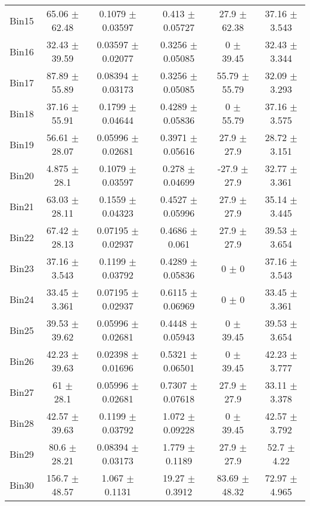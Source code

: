 \begin{tabular}{@{\extracolsep{4pt}}lccccc@{}}
     Bin15 & 65.06 $\pm$ 62.48 & 0.1079 $\pm$ 0.03597 & 0.413 $\pm$ 0.05727 & 27.9 $\pm$ 62.38 & 37.16 $\pm$ 3.543 \\ 
     Bin16 & 32.43 $\pm$ 39.59 & 0.03597 $\pm$ 0.02077 & 0.3256 $\pm$ 0.05085 & 0 $\pm$ 39.45 & 32.43 $\pm$ 3.344 \\ 
     Bin17 & 87.89 $\pm$ 55.89 & 0.08394 $\pm$ 0.03173 & 0.3256 $\pm$ 0.05085 & 55.79 $\pm$ 55.79 & 32.09 $\pm$ 3.293 \\ 
     Bin18 & 37.16 $\pm$ 55.91 & 0.1799 $\pm$ 0.04644 & 0.4289 $\pm$ 0.05836 & 0 $\pm$ 55.79 & 37.16 $\pm$ 3.575 \\ 
     Bin19 & 56.61 $\pm$ 28.07 & 0.05996 $\pm$ 0.02681 & 0.3971 $\pm$ 0.05616 & 27.9 $\pm$ 27.9 & 28.72 $\pm$ 3.151 \\ 
     Bin20 & 4.875 $\pm$ 28.1 & 0.1079 $\pm$ 0.03597 & 0.278 $\pm$ 0.04699 & -27.9 $\pm$ 27.9 & 32.77 $\pm$ 3.361 \\ 
     Bin21 & 63.03 $\pm$ 28.11 & 0.1559 $\pm$ 0.04323 & 0.4527 $\pm$ 0.05996 & 27.9 $\pm$ 27.9 & 35.14 $\pm$ 3.445 \\ 
     Bin22 & 67.42 $\pm$ 28.13 & 0.07195 $\pm$ 0.02937 & 0.4686 $\pm$ 0.061 & 27.9 $\pm$ 27.9 & 39.53 $\pm$ 3.654 \\ 
     Bin23 & 37.16 $\pm$ 3.543 & 0.1199 $\pm$ 0.03792 & 0.4289 $\pm$ 0.05836 & 0 $\pm$ 0 & 37.16 $\pm$ 3.543 \\ 
     Bin24 & 33.45 $\pm$ 3.361 & 0.07195 $\pm$ 0.02937 & 0.6115 $\pm$ 0.06969 & 0 $\pm$ 0 & 33.45 $\pm$ 3.361 \\ 
     Bin25 & 39.53 $\pm$ 39.62 & 0.05996 $\pm$ 0.02681 & 0.4448 $\pm$ 0.05943 & 0 $\pm$ 39.45 & 39.53 $\pm$ 3.654 \\ 
     Bin26 & 42.23 $\pm$ 39.63 & 0.02398 $\pm$ 0.01696 & 0.5321 $\pm$ 0.06501 & 0 $\pm$ 39.45 & 42.23 $\pm$ 3.777 \\ 
     Bin27 & 61 $\pm$ 28.1 & 0.05996 $\pm$ 0.02681 & 0.7307 $\pm$ 0.07618 & 27.9 $\pm$ 27.9 & 33.11 $\pm$ 3.378 \\ 
     Bin28 & 42.57 $\pm$ 39.63 & 0.1199 $\pm$ 0.03792 & 1.072 $\pm$ 0.09228 & 0 $\pm$ 39.45 & 42.57 $\pm$ 3.792 \\ 
     Bin29 & 80.6 $\pm$ 28.21 & 0.08394 $\pm$ 0.03173 & 1.779 $\pm$ 0.1189 & 27.9 $\pm$ 27.9 & 52.7 $\pm$ 4.22 \\ 
     Bin30 & 156.7 $\pm$ 48.57 & 1.067 $\pm$ 0.1131 & 19.27 $\pm$ 0.3912 & 83.69 $\pm$ 48.32 & 72.97 $\pm$ 4.965 \\ 
\hline\hline
  \end{tabular}
